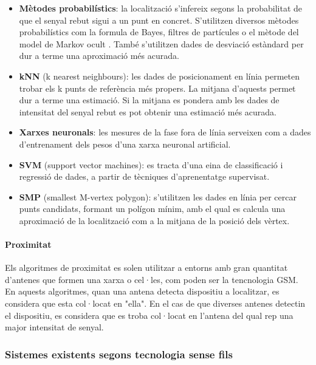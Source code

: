 \begin{itemize}

    \item \textbf{Mètodes probabilístics}: la localització s'infereix segons la probabilitat de que el senyal rebut sigui a un punt en concret. S'utilitzen diversos mètodes probabilístics com la formula de Bayes, filtres de partícules o el mètode del model de Markov ocult \cite{evennou}. També s'utilitzen dades de desviació estàndard per dur a terme una aproximació més acurada.
    \item \textbf{kNN} (k nearest neighbours): les dades de posicionament en línia permeten trobar els k punts de referència més propers. La mitjana d'aquests permet dur a terme una estimació. Si la mitjana es pondera amb les dades de intensitat del senyal rebut es pot obtenir una estimació més acurada.
    \item \textbf{Xarxes neuronals}: les mesures de la fase fora de línia serveixen com a dades d'entrenament dels pesos d'una xarxa neuronal artificial.
    \item \textbf{SVM} (support vector machines): es tracta d'una eina de classificació i regressió de dades, a partir de tècniques d’aprenentatge supervisat.
    \item \textbf{SMP} (smallest M-vertex polygon): s'utilitzen les dades en línia per cercar punts candidats, formant un polígon mínim, amb el qual es calcula una aproximació de la localització com a la mitjana de la posició dels vèrtex.

\end{itemize}

\paragraph{Proximitat}

Els algoritmes de proximitat es solen utilitzar a entorns amb gran quantitat d'antenes que formen una xarxa o cel·les, com poden ser la tencnologia GSM. En aquests algoritmes, quan una antena detecta dispositiu a localitzar, es considera que esta col·locat en "ella". En el cas de que diverses antenes detectin el dispositiu, es considera que es troba col·locat en l'antena del qual rep una major intensitat de senyal.

\subsubsection{Sistemes existents segons tecnologia sense fils}


